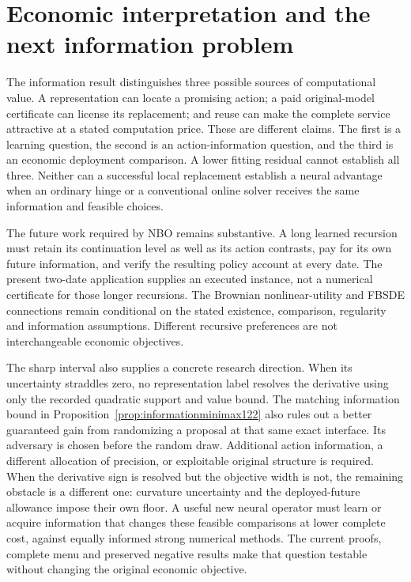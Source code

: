 \section{Economic interpretation and the next information problem}
\label{sec:discussion122}


The information result distinguishes three possible sources of computational
value. A representation can locate a promising action; a paid original-model
certificate can license its replacement; and reuse can make the complete
service attractive at a stated computation price. These are different claims.
The first is a learning question, the second is an action-information question,
and the third is an economic deployment comparison. A lower fitting residual
cannot establish all three. Neither can a successful local replacement establish
a neural advantage when an ordinary hinge or a conventional online solver
receives the same information and feasible choices.

The future work required by NBO remains substantive. A long learned recursion
must retain its continuation level as well as its action contrasts, pay for its
own future information, and verify the resulting policy account at every date.
The present two-date application supplies an executed instance, not a numerical
certificate for those longer recursions. The Brownian nonlinear-utility and
FBSDE connections remain conditional on the stated existence, comparison,
regularity and information assumptions. Different recursive preferences are
not interchangeable economic objectives.

The sharp interval also supplies a concrete research direction. When its
uncertainty straddles zero, no representation label resolves the derivative
using only the recorded quadratic support and value bound. The matching
information bound in Proposition~\ref{prop:informationminimax122} also rules
out a better guaranteed gain from randomizing a proposal at that same exact
interface. Its adversary is chosen before the random draw. Additional action
information, a different allocation of precision, or exploitable original
structure is required. When the derivative sign is resolved but the objective
width is not, the remaining obstacle is a different one: curvature uncertainty
and the deployed-future allowance impose their own floor. A useful new neural
operator must learn or acquire information that changes these feasible
comparisons at lower complete cost, against equally informed strong numerical
methods. The current proofs, complete menu and preserved negative results
make that question testable without changing the original economic objective.
